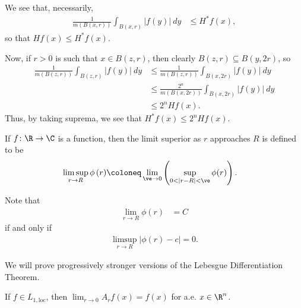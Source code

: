 \documentclass[10pt]{mypackage}
\begin{document}
\begin{solution}
  We see that, necessarily,
  \begin{align*}
    \frac{1}{m\left( B\left( x,r \right) \right)} \int_{B\left( x,r \right)}^{} \left\vert f(y) \right\vert\:dy &\leq H^{\ast}f(x),
  \end{align*}
  so that $Hf(x) \leq H^{\ast}f(x)$.\newline

  Now, if $r > 0$ is such that $x\in B\left( z,r \right)$, then clearly $B\left( z,r \right)\subseteq B\left( y,2r \right)$, so
  \begin{align*}
    \frac{1}{m\left( B\left( z,r \right) \right)} \int_{B\left( z,r \right)}^{} \left\vert f(y) \right\vert\:dy &\leq \frac{1}{m\left( B\left( z,r \right) \right)} \int_{B\left( x, 2r\right)}^{} \left\vert f(y) \right\vert\:dy\\
                                                                                                                &\leq \frac{2^{n}}{m\left( B\left( x,2r \right) \right)} \int_{B\left( x,2r \right)}^{} \left\vert f(y) \right\vert\:dy\\
                                                                                                                &\leq 2^{n}Hf(x).
  \end{align*}
  Thus, by taking suprema, we see that $H^{\ast}f(x) \leq 2^{n}Hf(x)$.
\end{solution}
\begin{definition}
  If $f\colon \R\rightarrow \C$ is a function, then the limit superior as $r$ approaches $R$ is defined to be
  \begin{align*}
    \limsup_{r\rightarrow R} \phi\left( r \right) &\coloneq \lim_{\ve\rightarrow 0} \left( \sup_{0 < \left\vert r-R \right\vert < \ve} \phi(r) \right).
  \end{align*}
\end{definition}
\begin{remark}
  Note that
  \begin{align*}
    \lim_{r\rightarrow R} \phi(r) &= C
  \end{align*}
  if and only if
  \begin{align*}
    \limsup_{r\rightarrow R} \left\vert \phi(r) - c \right\vert = 0.
  \end{align*}
\end{remark}
We will prove progressively stronger versions of the Lebesgue Differentiation Theorem.
\begin{theorem}
  If $f\in L_{1,\text{loc}}$, then $\lim_{r\rightarrow 0}A_rf(x) = f(x)$ for a.e. $x\in \R^n$.
\end{theorem}
\end{document}
